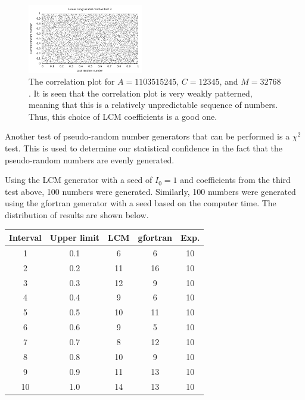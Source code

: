\documentclass[twocolumn]{myarticle}
\begin{document}
\begin{figure}[ht!]
    \begin{center}
    \includegraphics[width = 0.45\textwidth]{../Plots/LCM_test_3.pdf}
    \caption{%
        The correlation plot for $ A = 1103515245 $, $ C = 12345 $, and $ M = 32768 $.
        It is seen that the correlation plot is very weakly patterned, meaning that this is a relatively unpredictable sequence of numbers.
        Thus, this choice of LCM coefficients is a good one.
    }
    \label{fig:lcm_test_3}
    \end{center}
\end{figure}

Another test of pseudo-random number generators that can be performed is a $ \chi^2 $ test.
This is used to determine our statistical confidence in the fact that the pseudo-random numbers are evenly generated.

Using the LCM generator with a seed of $ I_0 = 1 $ and coefficients from the third test above, 100 numbers were generated.
Similarly, 100 numbers were generated using the gfortran generator with a seed based on the computer time.
The distribution of results are shown below.

\bigskip
\begin{center}
    \begin{tabular}{ccccc}
        \toprule
        Interval & Upper limit & LCM & gfortran & Exp. \\
        \midrule
        1  & 0.1 &  6 &  6 & 10 \\
        2  & 0.2 & 11 & 16 & 10 \\
        3  & 0.3 & 12 &  9 & 10 \\
        4  & 0.4 &  9 &  6 & 10 \\
        5  & 0.5 & 10 & 11 & 10 \\
        6  & 0.6 &  9 &  5 & 10 \\
        7  & 0.7 &  8 & 12 & 10 \\
        8  & 0.8 & 10 &  9 & 10 \\
        9  & 0.9 & 11 & 13 & 10 \\
        10 & 1.0 & 14 & 13 & 10 \\
        \bottomrule
    \end{tabular}
\end{center}
\bigskip
\end{document}
